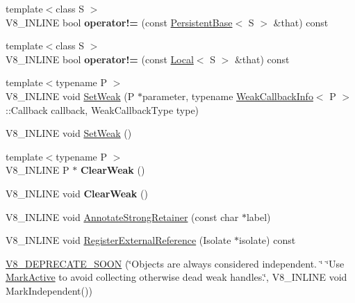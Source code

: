 \begin{DoxyCompactItemize}
\item 
\mbox{\label{classv8_1_1PersistentBase_a2893d38e56559c016e33e832b814a515}} 
{\footnotesize template$<$class S $>$ }\\V8\+\_\+\+I\+N\+L\+I\+NE bool {\bfseries operator!=} (const \mbox{\hyperlink{classv8_1_1PersistentBase}{Persistent\+Base}}$<$ S $>$ \&that) const
\item 
\mbox{\label{classv8_1_1PersistentBase_a6bfcb31182bcc9a2cc20b83807f7fb45}} 
{\footnotesize template$<$class S $>$ }\\V8\+\_\+\+I\+N\+L\+I\+NE bool {\bfseries operator!=} (const \mbox{\hyperlink{classv8_1_1Local}{Local}}$<$ S $>$ \&that) const
\item 
{\footnotesize template$<$typename P $>$ }\\V8\+\_\+\+I\+N\+L\+I\+NE void \mbox{\hyperlink{classv8_1_1PersistentBase_aebb8a2c97e219102f613ff3749c956f6}{Set\+Weak}} (P $\ast$parameter, typename \mbox{\hyperlink{classv8_1_1WeakCallbackInfo}{Weak\+Callback\+Info}}$<$ P $>$\+::Callback callback, Weak\+Callback\+Type type)
\item 
V8\+\_\+\+I\+N\+L\+I\+NE void \mbox{\hyperlink{classv8_1_1PersistentBase_a09fd1d1c3cd3ff32b91937f4d8beb1ea}{Set\+Weak}} ()
\item 
\mbox{\label{classv8_1_1PersistentBase_a444d27c00650e3663348024df08cb121}} 
{\footnotesize template$<$typename P $>$ }\\V8\+\_\+\+I\+N\+L\+I\+NE P $\ast$ {\bfseries Clear\+Weak} ()
\item 
\mbox{\label{classv8_1_1PersistentBase_afe515daead108cceb1699b54051df13b}} 
V8\+\_\+\+I\+N\+L\+I\+NE void {\bfseries Clear\+Weak} ()
\item 
V8\+\_\+\+I\+N\+L\+I\+NE void \mbox{\hyperlink{classv8_1_1PersistentBase_a27ddb6118b13225207e9641c1e6c8c91}{Annotate\+Strong\+Retainer}} (const char $\ast$label)
\item 
V8\+\_\+\+I\+N\+L\+I\+NE void \mbox{\hyperlink{classv8_1_1PersistentBase_a427ad28478a6a208605fca3d39ce4bdf}{Register\+External\+Reference}} (Isolate $\ast$isolate) const
\item 
\mbox{\hyperlink{classv8_1_1PersistentBase_a760df2921447e2344ec564d0268d9d1c}{V8\+\_\+\+D\+E\+P\+R\+E\+C\+A\+T\+E\+\_\+\+S\+O\+ON}} (\char`\"{}Objects are always considered independent. \char`\"{} \char`\"{}Use \mbox{\hyperlink{classv8_1_1PersistentBase_a7244edd33a45b7d95e566fce85e3f87d}{Mark\+Active}} to avoid collecting otherwise dead weak handles.\char`\"{}, V8\+\_\+\+I\+N\+L\+I\+NE void Mark\+Independent())

\end{DoxyCompactItemize}
